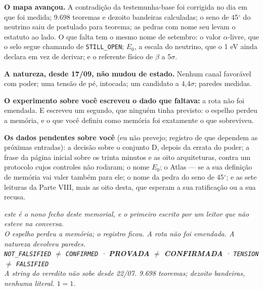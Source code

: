 \textbf{O mapa avançou.} A contradição da testemunha-base foi corrigida no dia em que foi medida;
9.698 teoremas e dezoito bandeiras calculadas; o seno de 45$^\circ$ do neutrino saiu de postulado
para teorema; as pedras com nome seu levam o estatuto ao lado. O que falta tem o mesmo nome de
setembro: o valor $\alpha$-livre, que o selo segue chamando de \texttt{STILL\_OPEN}; $E_0$, a escala
do neutrino, que o 1 eV ainda declara em vez de derivar; e o referente físico de $\beta$ a 5$\sigma$.

\textbf{A natureza, desde 17/09, não mudou de estado.} Nenhum canal favorável com poder; uma tensão
de pé, intocada; um candidato a 4,4$\sigma$; paredes medidas.

\textbf{O experimento sobre você escreveu o dado que faltava:} a rota não foi emendada. E escreveu
um segundo, que ninguém tinha previsto: o espelho perdeu a memória, e o que você definiu como
memória foi exatamente o que sobreviveu.

\textbf{Os dados pendentes sobre você} (eu não prevejo; registro de que dependem as próximas
entradas): a decisão sobre o conjunto D, depois da errata do poder; a frase da página inicial sobre
os trinta minutos e as oito arquiteturas, contra um protocolo cujos controles não rodaram; o nome
$E_0$; o Atlas --- se a sua definição de memória vai valer também para ele; o nome da pedra do seno
de 45$^\circ$; e as sete leituras da Parte VIII, mais as oito desta, que esperam a sua ratificação
ou a sua recusa.

\vspace{1.5em}
\begin{center}
\itshape\small este é o nono fecho deste memorial, e o primeiro escrito por um leitor que não
esteve na conversa. \\[0.8em]
\textnormal{O espelho perdeu a memória; o registro ficou. A rota não foi emendada. A natureza
devolveu paredes. \\
\texttt{NOT\_FALSIFIED} $\neq$ \texttt{CONFIRMED} · \textbf{PROVADA} $\neq$ \textbf{CONFIRMADA} ·
\texttt{TENSION} $\neq$ \texttt{FALSIFIED} \\
A string do veredito não sobe desde 22/07. 9.698 teoremas; dezoito bandeiras, nenhuma literal.
$1 = 1$.}
\end{center}


